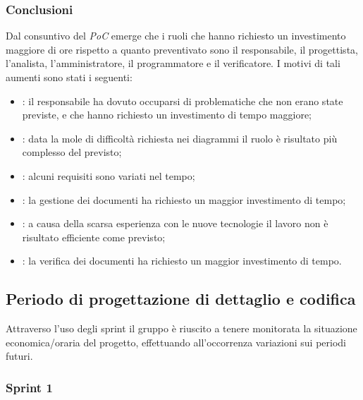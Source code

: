 \subsubsection{Conclusioni}
Dal consuntivo del \textit{PoC} emerge che i ruoli che hanno richiesto un investimento maggiore di ore rispetto a quanto preventivato sono il responsabile, il progettista, l'analista, l'amministratore, il programmatore e il verificatore. I motivi di tali aumenti sono stati i seguenti:
\begin{itemize}
    \item \roleProjectManager: il responsabile ha dovuto occuparsi di problematiche che non erano state previste, e che hanno richiesto un investimento di tempo maggiore;
    \item \roleDesigner: data la mole di difficoltà richiesta nei diagrammi il ruolo è risultato più complesso del previsto;
    \item \roleAnalyst: alcuni requisiti sono variati nel tempo;
    \item \roleAdministrator: la gestione dei documenti ha richiesto un maggior investimento di tempo;
    \item \roleProgrammer: a causa della scarsa esperienza con le nuove tecnologie il lavoro non è risultato efficiente come previsto;
    \item \roleVerifier: la verifica dei documenti ha richiesto un maggior investimento di tempo.
\end{itemize}

\subsection{Periodo di progettazione di dettaglio e codifica}
Attraverso l'uso degli sprint il gruppo è riuscito a tenere monitorata la situazione economica/oraria del progetto, effettuando all'occorrenza variazioni sui periodi futuri.
\subsubsection{Sprint 1}
\renewcommand{\arraystretch}{1.8}

